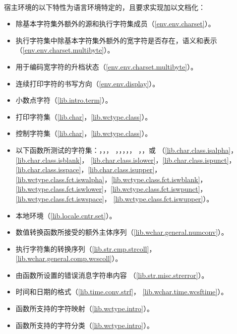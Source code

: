 \paragraph{}
宿主环境的以下特性为语言环境特定的，且要求实现加以文档化：
\begin{itemize} %
  \item{除基本字符集外额外的源和执行字符集成员（\ref{env.env.charset}）。}
  \item{执行字符集中除基本字符集外额外的宽字符是否存在，语义和表示
    （\ref{env.env.charset.multibyte}）。}
  \item{用于编码宽字符的升档状态（\ref{env.env.charset.multibyte}）。}
  \item{连续打印字符的书写方向（\ref{env.env.display}）。}
  \item{小数点字符（\ref{lib.intro.term}）。}
  \item{打印字符集（\ref{lib.char}，\ref{lib.wctype.class}）。}
  \item{控制字符集（\ref{lib.char}，\ref{lib.wctype.class}）。}
  \item{以下函数所测试的字符集：，，，
    ，，，，，
    ，，或
    （\ref{lib.char.class.isalpha}，\ref{lib.char.class.isblank}，
    \ref{lib.char.class.islower}，\ref{lib.char.class.ispunct}，
    \ref{lib.char.class.isspace}，\ref{lib.char.class.isupper}，
    \ref{lib.wctype.class.fct.iswalpha}，\ref{lib.wctype.class.fct.iswblank}，
    \ref{lib.wctype.class.fct.iswlower}，\ref{lib.wctype.class.fct.iswpunct}，
    \ref{lib.wctype.class.fct.iswspace}，
    \ref{lib.wctype.class.fct.iswupper}）。}
  \item{本地环境（\ref{lib.locale.cntr.set}）。}
  \item{数值转换函数所接受的额外主体序列（\ref{lib.wchar.general.numconv}）。}
  \item{执行字符集的转换序列（\ref{lib.str.cmp.strcoll}，
    \ref{lib.wchar.general.comp.wcscoll}）。}
  \item{由函数所设置的错误消息字符串内容
    （\ref{lib.str.misc.strerror}）。}
  \item{时间和日期的格式（\ref{lib.time.conv.strf}，
    \ref{lib.wchar.time.wcsftime}）。}
  \item{函数所支持的字符映射（\ref{lib.wctype.intro}）。}
  \item{函数所支持的字符分类（\ref{lib.wctype.intro}）。}
\end{itemize}

